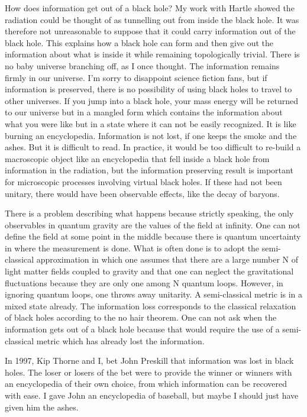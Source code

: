 \documentclass[aps,prd,groupedaddress,showpacs,12pt]{revtex4-1}
\begin{document}
How does information get out of a black hole? My work with Hartle\cite{HartleHawking} showed the radiation could be thought of as tunnelling out from inside the black hole. It was therefore not unreasonable to suppose that it could carry information out of the black hole.  This explains how a black hole can form and then give out the information about what is inside it while remaining topologically trivial. There is no baby universe branching off, as I once thought. The information remains firmly in our universe. I'm sorry to disappoint science fiction fans, but if information is preserved, there is no possibility of using black holes to travel to other universes. If you jump into a black hole, your mass energy will be returned to our universe but in a mangled form which contains the information about what you were like but in a  state where it can not be easily recognized.  It is like burning an encyclopedia. Information is not lost, if one keeps the smoke and the ashes. But it is difficult to read. In practice, it would be too difficult to re-build a macroscopic object like an encyclopedia that fell inside a black hole from information in the radiation, but the information preserving result is important for microscopic processes involving virtual black holes. If these had not been unitary, there would have been observable effects, like the decay of baryons. 



There is a problem describing what happens because strictly speaking, the only observables in quantum gravity are the values of the field at infinity. One can not define the field at some point in the middle because there is quantum uncertainty in where the measurement is done. What is often done is to adopt the semi-classical approximation in which one assumes that there are a large number N of light matter fields coupled to gravity and that one can neglect the gravitational fluctuations because they are only one among N quantum loops. However, in ignoring quantum loops, one throws away unitarity. A semi-classical metric is in a mixed state already. The information loss corresponds to the classical relaxation of black holes according to the no hair theorem. One can not ask when the information gets out of a black hole because that would require the use of a semi-classical metric which has already lost the information. 

  

In 1997, Kip Thorne and I,  bet John Preskill that information was lost in black holes. The loser or losers of the bet  were to provide the winner or winners with an encyclopedia of their own choice, from which information can be recovered with ease. I gave John an encyclopedia of baseball, but maybe I should just have given him the ashes.
\end{document}

